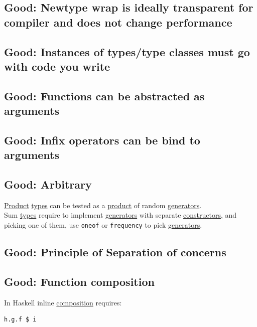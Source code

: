 \documentclass[11pt]{article}
\begin{document}
\subsection{\label{orgb8ace3f}Good: Newtype wrap is ideally transparent for compiler and does not change performance}
\label{sec:org5a6af91}

\subsection{\label{org2a2ae03}Good: Instances of types/type classes must go with code you write}
\label{sec:org1e10659}

\subsection{\label{org18f1ee1}Good: Functions can be abstracted as arguments}
\label{sec:orgfc42ece}

\subsection{\label{orgb1c9992}Good: Infix operators can be bind to arguments}
\label{sec:orgc3e1fed}

\subsection{\label{org4c5ce3a}Good: Arbitrary}
\label{sec:orge59deaf}
\hyperref[orga3d1454]{Product} \hyperref[org3927fd9]{types} can be tested as a \hyperref[orga3d1454]{product} of random \hyperref[org86017a3]{generators}.\\
Sum \hyperref[org3927fd9]{types} require to implement \hyperref[org86017a3]{generators} with separate \hyperref[orgc5bd814]{constructors}, and picking one of them, use \texttt{oneof} or \texttt{frequency} to pick \hyperref[org86017a3]{generators}.\\

\subsection{\label{orgfdef3e6}Good: Principle of Separation of concerns}
\label{sec:orgcd78308}

\subsection{\label{org69e6936}Good: Function composition}
\label{sec:orgde2ddfb}
In Haskell inline \hyperref[org24a8abd]{composition} requires:\\
\begin{verbatim}
h.g.f $ i
\end{verbatim}
\end{document}
